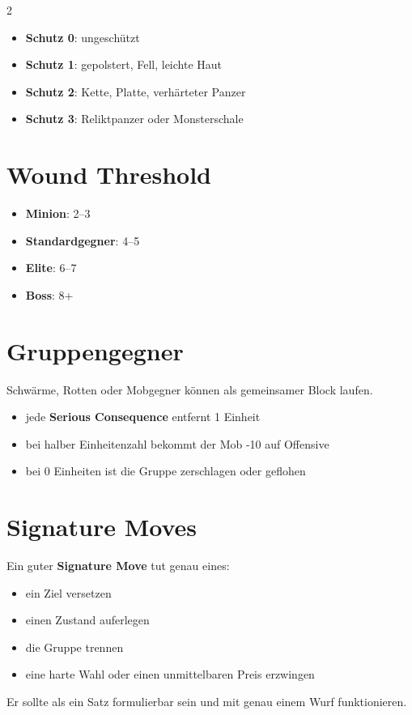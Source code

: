 \begin{multicols*}{2}
\begin{itemize}[leftmargin=*]
\item \textbf{Schutz 0}: ungeschützt
\item \textbf{Schutz 1}: gepolstert, Fell, leichte Haut
\item \textbf{Schutz 2}: Kette, Platte, verhärteter Panzer
\item \textbf{Schutz 3}: Reliktpanzer oder Monsterschale
\end{itemize}

\section{Wound Threshold}
\begin{itemize}[leftmargin=*]
\item \textbf{Minion}: 2--3
\item \textbf{Standardgegner}: 4--5
\item \textbf{Elite}: 6--7
\item \textbf{Boss}: 8+
\end{itemize}

\section{Gruppengegner}
Schwärme, Rotten oder Mobgegner können als gemeinsamer Block laufen.
\begin{itemize}[leftmargin=*]
\item jede \textbf{Serious Consequence} entfernt 1 Einheit
\item bei halber Einheitenzahl bekommt der Mob -10 auf Offensive
\item bei 0 Einheiten ist die Gruppe zerschlagen oder geflohen
\end{itemize}

\section{Signature Moves}
Ein guter \textbf{Signature Move} tut genau eines:
\begin{itemize}[leftmargin=*]
\item ein Ziel versetzen
\item einen Zustand auferlegen
\item die Gruppe trennen
\item eine harte Wahl oder einen unmittelbaren Preis erzwingen
\end{itemize}

Er sollte als ein Satz formulierbar sein und mit genau einem Wurf funktionieren.


\end{multicols*}
